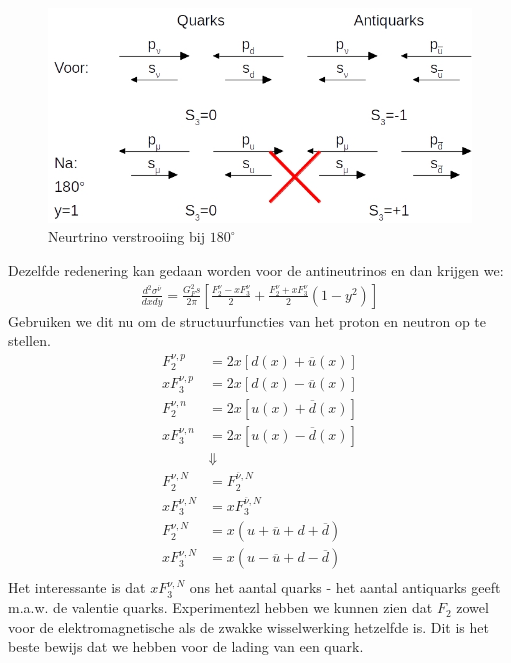 \documentclass[../main.tex]{subfiles}
\begin{document}
\begin{figure}[h]
    \centering
    \includegraphics[width=0.8\linewidth]{DIS_nucleon_structuur_pdf/neutr_scat_f_3.jpg}
    \caption{Neurtrino verstrooiing bij $180^\circ$}%
    \label{fig:neutr_scat_f_3}
\end{figure}

Dezelfde redenering kan gedaan worden voor de antineutrinos en dan krijgen we:
\begin{equation}
    \begin{aligned}
        \label{eq:struct_func_nucleon_zwak_anti}
        \frac{d^2 \sigma^{\overline \nu}}{dxdy} = \frac{G_F^2 s}{2\pi} \left[ \frac{F_2^\nu-xF_3^\nu}{2} + \frac{F_2^\nu+xF_3^\nu}{2}(1-y^2) \right]
    \end{aligned}
\end{equation}
Gebruiken we dit nu om de structuurfuncties van het proton en neutron op te stellen.
\begin{equation}
    \begin{aligned}
        \label{eq:struct_func_neutrino_proton_neutron}
        F_2^{\nu, p} &= 2x[d(x)+\overline u(x)]\\
        xF_3^{\nu, p} &= 2x[d(x)-\overline u(x)]\\
        F_2^{\nu, n} &= 2x[u(x)+\overline d(x)]\\
        xF_3^{\nu, n} &= 2x[u(x)-\overline d(x)]\\
                      &\Downarrow\\
        F_2^{\nu, N} &= F_2^{\overline \nu, N}\\
        xF_3^{\nu, N} &= xF_3^{\overline \nu, N}\\
        F_2^{\nu, N} &= x(u+\overline u+d+\overline d)\\
        xF_3^{\nu, N} &= x(u-\overline u+d-\overline d)\\
    \end{aligned}
\end{equation}
Het interessante is dat $xF_3^{\nu, N}$ ons het aantal quarks - het aantal antiquarks geeft m.a.w. de valentie quarks. Experimentezl hebben we kunnen zien dat $F_2$ zowel voor de elektromagnetische als de zwakke wisselwerking hetzelfde is. Dit is het beste bewijs dat we hebben voor de lading van een quark.
\end{document}

